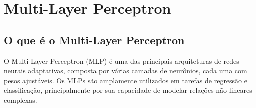 \documentclass[12pt,a4paper,oneside]{report}
\begin{document}
	
	\tableofcontents
	
	\clearpage
	
	\chapter{Multi-Layer Perceptron}
	\label{sec:introducao}
	
	\section{O que é o Multi-Layer Perceptron}
	
%	
%	
%	
	
	O Multi-Layer Perceptron (MLP) é uma das principais arquiteturas de redes neurais adaptativas, composta por várias camadas de neurônios, cada uma com pesos ajustáveis\cite{tracker:2024}\cite{culturamix:2009}. %
	Os MLPs s\~ao amplamente utilizados em tarefas de regress\~ao e classifica\c{c}\~ao, principalmente por sua capacidade de modelar rela\c{c}\~oes n\~ao lineares complexas.
	
\end{document}
